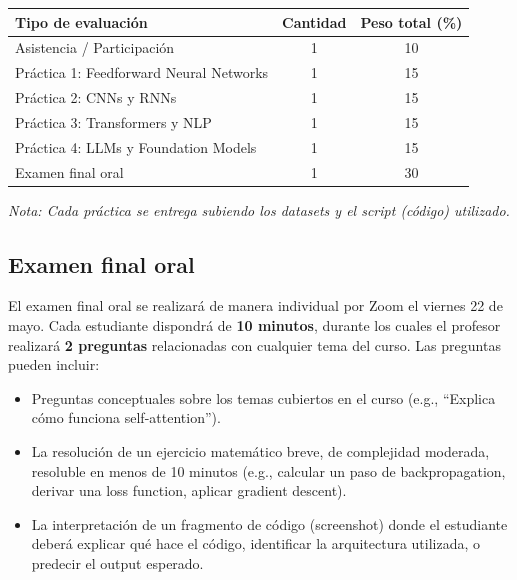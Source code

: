 \documentclass[11pt,a4paper]{article}
\begin{document}
\vspace{0.3cm}

\begin{center}
\begin{tabular}{|l|c|c|}
\hline
\textbf{Tipo de evaluaci\'on} & \textbf{Cantidad} & \textbf{Peso total (\%)} \\
\hline
Asistencia / Participaci\'on & 1 & 10 \\
\hline
Pr\'actica 1: Feedforward Neural Networks & 1 & 15 \\
\hline
Pr\'actica 2: CNNs y RNNs & 1 & 15 \\
\hline
Pr\'actica 3: Transformers y NLP & 1 & 15 \\
\hline
Pr\'actica 4: LLMs y Foundation Models & 1 & 15 \\
\hline
Examen final oral & 1 & 30 \\
\hline
\end{tabular}
\end{center}

\vspace{0.3cm}
\textit{Nota: Cada pr\'actica se entrega subiendo los datasets y el script (c\'odigo) utilizado.}

\subsection*{Examen final oral}

El examen final oral se realizar\'a de manera individual por Zoom el viernes 22 de mayo. Cada estudiante dispondr\'a de \textbf{10 minutos}, durante los cuales el profesor realizar\'a \textbf{2 preguntas} relacionadas con cualquier tema del curso. Las preguntas pueden incluir:

\begin{itemize}[leftmargin=2cm]
    \item Preguntas conceptuales sobre los temas cubiertos en el curso (e.g., ``Explica c\'omo funciona self-attention'').
    \item La resoluci\'on de un ejercicio matem\'atico breve, de complejidad moderada, resoluble en menos de 10 minutos (e.g., calcular un paso de backpropagation, derivar una loss function, aplicar gradient descent).
    \item La interpretaci\'on de un fragmento de c\'odigo (screenshot) donde el estudiante deber\'a explicar qu\'e hace el c\'odigo, identificar la arquitectura utilizada, o predecir el output esperado.
\end{itemize}
\end{document}
